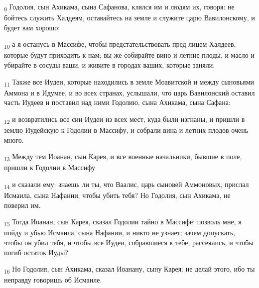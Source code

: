 \begin{tcolorbox}
\textsubscript{9} Годолия, сын Ахикама, сына Сафанова, клялся им и людям их, говоря: не бойтесь служить Халдеям, оставайтесь на земле и служите царю Вавилонскому, и будет вам хорошо;
\end{tcolorbox}
\begin{tcolorbox}
\textsubscript{10} а я останусь в Массифе, чтобы предстательствовать пред лицем Халдеев, которые будут приходить к нам; вы же собирайте вино и летние плоды, и масло и убирайте в сосуды ваши, и живите в городах ваших, которые заняли.
\end{tcolorbox}
\begin{tcolorbox}
\textsubscript{11} Также все Иудеи, которые находились в земле Моавитской и между сыновьями Аммона и в Идумее, и во всех странах, услышали, что царь Вавилонский оставил часть Иудеев и поставил над ними Годолию, сына Ахикама, сына Сафана:
\end{tcolorbox}
\begin{tcolorbox}
\textsubscript{12} и возвратились все сии Иудеи из всех мест, куда были изгнаны, и пришли в землю Иудейскую к Годолии в Массифу, и собрали вина и летних плодов очень много.
\end{tcolorbox}
\begin{tcolorbox}
\textsubscript{13} Между тем Иоанан, сын Карея, и все военные начальники, бывшие в поле, пришли к Годолии в Массифу
\end{tcolorbox}
\begin{tcolorbox}
\textsubscript{14} и сказали ему: знаешь ли ты, что Ваалис, царь сыновей Аммоновых, прислал Исмаила, сына Нафании, чтобы убить тебя? Но Годолия, сын Ахикама, не поверил им.
\end{tcolorbox}
\begin{tcolorbox}
\textsubscript{15} Тогда Иоанан, сын Карея, сказал Годолии тайно в Массифе: позволь мне, я пойду и убью Исмаила, сына Нафании, и никто не узнает; зачем допускать, чтобы он убил тебя, и чтобы все Иудеи, собравшиеся к тебе, рассеялись, и чтобы погиб остаток Иуды?
\end{tcolorbox}
\begin{tcolorbox}
\textsubscript{16} Но Годолия, сын Ахикама, сказал Иоанану, сыну Карея: не делай этого, ибо ты неправду говоришь об Исмаиле.
\end{tcolorbox}
